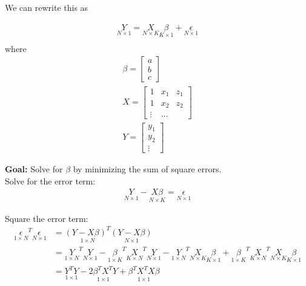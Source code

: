 \documentclass{article}
\begin{document}
We can rewrite this as

\begin{align}
    \underset{N \times 1} Y = \underset{N \times K } X 
                              \underset{K \times 1} \beta +  \underset{ N \times 1} \epsilon\\
\end{align} 
where 
\begin{align}
    \beta = \begin{bmatrix}
        a\\
        b\\
        c
    \end{bmatrix} \label{params}\\
    X = \begin{bmatrix}
        1 & x_1& z_1\\
        1 & x_2 & z_2\\
        \vdots & ...
    \end{bmatrix}\\
    Y = \begin{bmatrix}
        y_1\\
        y_2\\
        \vdots
    \end{bmatrix}
\end{align}

\textbf{Goal:} Solve for $\beta$ by minimizing the sum of square errors. \\

Solve for the error term:
\begin{align}
    \underset{N \times 1} Y - \underset{N \times K}{X \beta} = \underset{N \times 1} \epsilon
\end{align}

Square the error term:
\begin{align}
    \underset{1 \times N} \epsilon^T  \underset{N \times 1}\epsilon &= 
        \underset{1 \times N}{(Y - X \beta)^T} \underset{N \times 1}{(Y - X \beta)} \\
    &= \underset{1 \times N}Y^T \underset{N \times 1} Y - \underset{1 \times K} \beta^T \underset{K \times N} X^T \underset{N \times 1} Y - \underset{1 \times N} Y^T \underset{N \times K} X \underset{K \times 1}\beta + \underset{1 \times K}\beta^T \underset{K \times N}X^T \underset{N \times K}X \underset{K \times 1}\beta\\
    &= \underset{1 \times 1}{Y^T Y} - \underset{1 \times 1}{2 \beta^T X^T Y} + \underset{1 \times 1}{\beta^T X^T X \beta}
\end{align}
\end{document}
